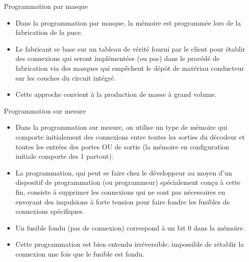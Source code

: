 \documentclass[presentation]{beamer}
\begin{document}
\begin{frame}[label={sec:org981d566}]{Programmation par masque}
\begin{itemize}
\item Dans la \alert{programmation par masque}, la mémoire est programmée lors de la fabrication de la puce.

\item Le fabricant se base sur un tableau de vérité fourni par le client pour établir des connexions qui seront implémentées (ou pas) dans le procédé de fabrication via des masques qui empêchent le dépôt de matériau conducteur sur les couches du circuit intégré.

\item Cette approche convient à la production de masse à grand volume.
\end{itemize}
\end{frame}

\begin{frame}[label={sec:org18c390f}]{Programmation sur mesure}
\begin{itemize}
\item Dans la \alert{programmation sur mesure}, on utilise un type de mémoire qui comporte initialement des connexions entre toutes les sorties du décodeur et toutes les entrées des portes OU de sortie (la mémoire en configuration initiale comporte des 1 partout).

\item La programmation, qui peut se faire chez le développeur au moyen d'un dispositif de programmation (ou programmeur) spécialement conçu à cette fin, consiste à supprimer les connexions qui ne sont pas nécessaires en envoyant des impulsions à forte tension pour faire fondre les fusibles de connexions spécifiques.

\item Un fusible fondu (pas de connexion) correspond à un bit 0 dans la mémoire.

\item Cette programmation est bien entendu irréversible: impossible de rétablir la connexion une fois que le fusible est fondu.
\end{itemize}
\end{frame}
\end{document}
